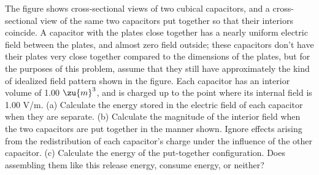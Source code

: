         The figure shows cross-sectional views of two cubical
        capacitors, and a cross-sectional view of the same two
        capacitors put together so that their interiors coincide. A
        capacitor with the plates close together has a nearly
        uniform electric field between the plates, and almost zero
        field outside; these capacitors don't have their plates very
        close together compared to the dimensions of the plates, but
        for the purposes of this problem, assume that they still
        have approximately the kind of idealized field pattern shown
        in the figure. Each capacitor has an interior volume of 1.00
        $\zu{m}^3$, and is charged up to the point where its internal
        field is 1.00 V/m. \hwendpart
        (a) Calculate the energy stored in the
        electric field of each capacitor when they are separate. \answercheck\hwendpart
        (b) Calculate the magnitude of the interior field when the two
        capacitors are put together in the manner shown. Ignore
        effects arising from the redistribution of each capacitor's
        charge under the influence of the other capacitor.\answercheck\hwendpart
        (c) Calculate the energy of the put-together configuration. Does
        assembling them like this release energy, consume energy, or neither?\answercheck
